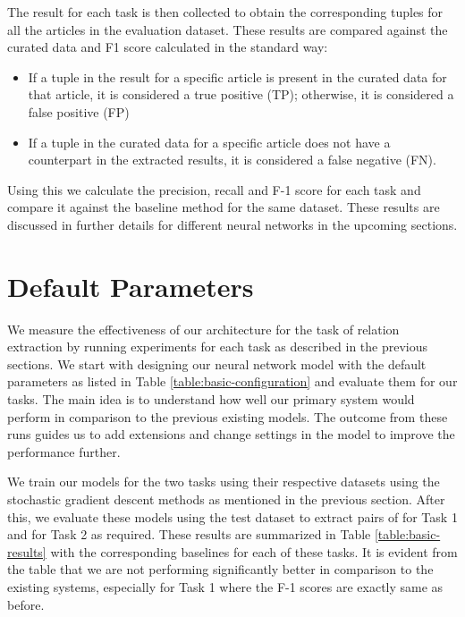The result for each task is then collected to obtain the corresponding tuples for all the articles in the evaluation dataset. These results are compared against the curated data and F1 score calculated in the standard way:

\begin{itemize}[noitemsep]
    \item If a tuple in the result for a specific article is present in the curated data for that article, it is considered a true positive (TP); otherwise, it is considered a false positive (FP)
    
    \item If a tuple in the curated data for a specific article does not have a counterpart in the extracted results, it is considered a false negative (FN). 
\end{itemize}

Using this we calculate the precision, recall and F-1 score for each task and compare it against the baseline method for the same dataset. These results are discussed in further details for different neural networks in the upcoming sections.

\section{Default Parameters}
\label{section:default-parameters}
We measure the effectiveness of our architecture for the task of relation extraction by running experiments for each task as described in the previous sections. We start with designing our neural network model with the default parameters as listed in Table \ref{table:basic-configuration} and evaluate them for our tasks. The main idea is to understand how well our primary system would perform in comparison to the previous existing models. The outcome from these runs guides us to add extensions and change settings in the model to improve the performance further. 

We train our models for the two tasks using their respective datasets using the stochastic gradient descent methods as mentioned in the previous section. After this, we evaluate these models using the test dataset to extract pairs of {\it <stage, ethnicity>} for Task 1 and {\it <stage, sample size>} for Task 2 as required. These results are summarized in Table \ref{table:basic-results} with the corresponding baselines for each of these tasks. It is evident from the table that we are not performing significantly better in comparison to the existing systems, especially for Task 1 where the F-1 scores are exactly same as before.

